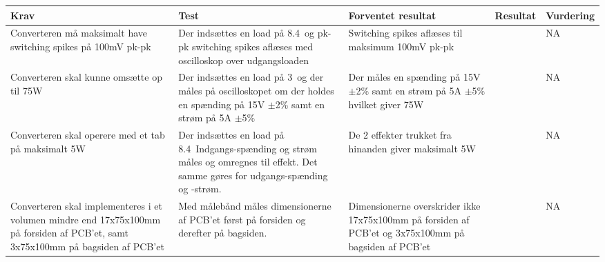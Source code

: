 \begin{tabularx}{\textwidth}{|X|X|X|X|X|}
	\hline
	\textbf{Krav} & \textbf{Test} & \textbf{Forventet resultat} & \textbf{Resultat} & \textbf{Vurdering} \\ \hline
	Converteren må maksimalt have switching spikes på 100mV pk-pk & Der indsættes en load på 8.4\ohm\ og pk-pk switching spikes aflæses med oscilloskop over udgangsloaden & Switching spikes aflæses til maksimum 100mV pk-pk && NA \\ \hline
	Converteren skal kunne omsætte op til 75W & Der indsættes en load på 3\ohm\ og der måles på oscilloskopet om der holdes en spænding på 15V $\pm$2\% samt en strøm på 5A $\pm$5\% & Der måles en spænding på 15V $\pm$2\% samt en strøm på 5A $\pm$5\% hvilket giver 75W && NA \\ \hline
	Converteren skal operere med et tab på maksimalt 5W & Der indsættes en load på 8.4\ohm\ Indgangs-spænding og strøm måles og omregnes til effekt. Det samme gøres for udgangs-spænding og -strøm. & De 2 effekter trukket fra hinanden giver maksimalt 5W && NA \\ \hline 
	Converteren skal implementeres i et volumen mindre end 17x75x100mm på forsiden af PCB'et, samt 3x75x100mm på bagsiden af PCB'et & Med målebånd måles dimensionerne af PCB'et først på forsiden og derefter på bagsiden. & Dimensionerne overskrider ikke 17x75x100mm på forsiden af PCB'et og 3x75x100mm på bagsiden af PCB'et && NA \\ \hline
	
\end{tabularx}



